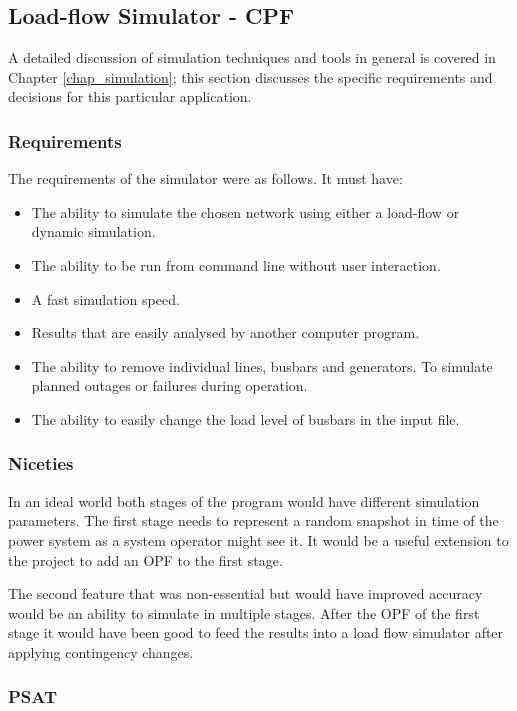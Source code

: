 \documentclass[a4paper,oneside,12pt]{report}
\begin{document}
\subsection{Load-flow Simulator - CPF}

A detailed discussion of simulation techniques and tools in general is covered in Chapter \ref{chap_simulation}; this section discusses the specific requirements and decisions for this particular application.

\subsubsection{Requirements}
The requirements of the simulator were as follows. It must have:

\begin{itemize}
\item The ability to simulate the chosen network using either a load-flow or dynamic simulation.
\item The ability to be run from command line without user interaction.
\item A fast simulation speed.
\item Results that are easily analysed by another computer program.
\item The ability to remove individual lines, busbars and generators. To simulate planned outages or failures during operation.
\item The ability to easily change the load level of busbars in the input file.
\end{itemize}

\subsubsection{Niceties}

In an ideal world both stages of the program would have different simulation parameters. The first stage needs to represent a random snapshot in time of the power system as a system operator might see it. It would be a useful extension to the project to add an OPF to the first stage. 

The second feature that was non-essential but would have improved accuracy would be an ability to simulate in multiple stages. After the OPF of the first stage it would have been good to feed the results into a load flow simulator after applying contingency changes. 

\subsubsection{PSAT}
\end{document}
